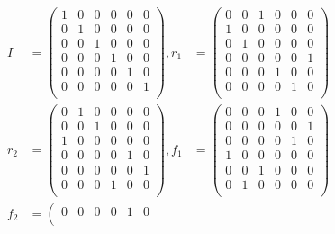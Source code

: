 \documentclass[]{ctexart}
\begin{document}
			\begin{equation*}
			\begin{aligned}
				I&=
				\left(
				\begin{array}{cccccc}
				1 & 0 & 0 & 0 & 0 & 0 \\
				0 & 1 & 0 & 0 & 0 & 0 \\
				0 & 0 & 1 & 0 & 0 & 0 \\
				0 & 0 & 0 & 1 & 0 & 0 \\
				0 & 0 & 0 & 0 & 1 & 0 \\
				0 & 0 & 0 & 0 & 0 & 1 \\
				\end{array}
				\right),
				r_1&=
				\left(
				\begin{array}{cccccc}
				0 & 0 & 1 & 0 & 0 & 0 \\
				1 & 0 & 0 & 0 & 0 & 0 \\
				0 & 1 & 0 & 0 & 0 & 0 \\
				0 & 0 & 0 & 0 & 0 & 1 \\
				0 & 0 & 0 & 1 & 0 & 0 \\
				0 & 0 & 0 & 0 & 1 & 0 \\
				\end{array}
				\right)\\
				r_2&=
				\left(
				\begin{array}{cccccc}
				0 & 1 & 0 & 0 & 0 & 0 \\
				0 & 0 & 1 & 0 & 0 & 0 \\
				1 & 0 & 0 & 0 & 0 & 0 \\
				0 & 0 & 0 & 0 & 1 & 0 \\
				0 & 0 & 0 & 0 & 0 & 1 \\
				0 & 0 & 0 & 1 & 0 & 0 \\
				\end{array}
				\right),
				f_1&=
				\left(
				\begin{array}{cccccc}
				0 & 0 & 0 & 1 & 0 & 0 \\
				0 & 0 & 0 & 0 & 0 & 1 \\
				0 & 0 & 0 & 0 & 1 & 0 \\
				1 & 0 & 0 & 0 & 0 & 0 \\
				0 & 0 & 1 & 0 & 0 & 0 \\
				0 & 1 & 0 & 0 & 0 & 0 \\
				\end{array}
				\right)\\
				f_2&=
				\left(
				\begin{array}{cccccc}
				0 & 0 & 0 & 0 & 1 & 0 \\

\end{array}
\end{aligned}
\end{equation*}
\end{document}
